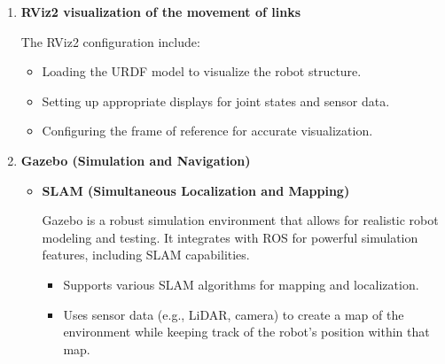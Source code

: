 {\begin{enumerate}[label=\textbf{\arabic*}.]
		
	\begin{figure}[H]
		\centering
		\hfill
		\hfill
		\caption{Links and Joints \cite{links} \cite{joints}} 
		\label{fig:fig5}
	\end{figure}
	
		\item \textbf{RViz2 visualization of the movement of links} \par The RViz2 configuration include:
		\begin{itemize}
			\item Loading the URDF model to visualize the robot structure.
			\item Setting up appropriate displays for joint states and sensor data.
			\item Configuring the frame of reference for accurate visualization.
		\end{itemize}
		
		\item \textbf{Gazebo (Simulation and Navigation)}
		\begin{itemize}
			\item \textbf{SLAM (Simultaneous Localization and Mapping)} \par Gazebo is a robust simulation environment that allows for realistic robot modeling and testing. It integrates with ROS for powerful simulation features, including SLAM capabilities.
			\begin{itemize}
				\item Supports various SLAM algorithms for mapping and localization.
				\item Uses sensor data (e.g., LiDAR, camera) to create a map of the environment while
				keeping track of the robot's position within that map.
			\end{itemize}
			

\end{itemize}
\end{enumerate}}

